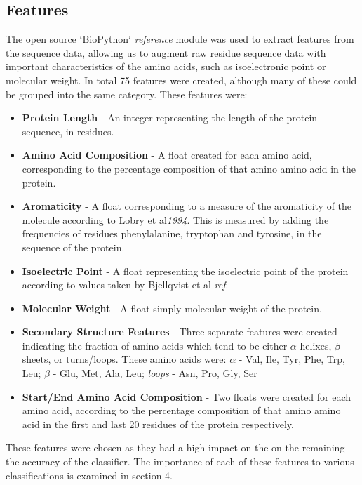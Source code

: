\documentclass{bioinfo}
\begin{document}
\subsection{Features}

The open source `BioPython` \textit{reference} module was used to extract features from the sequence data, allowing us to augment raw residue sequence data with important characteristics of the amino acids, such as isoelectronic point or molecular weight. In total 75 features were created, although many of these could be grouped into the same category. These features were:

\begin{itemize}


\item{ \textbf{Protein Length} } - An integer representing the length of the protein sequence, in residues.
\item{ \textbf{Amino Acid Composition} } - A float created for each amino acid, corresponding to the percentage composition of that amino amino acid in the protein.
\item{ \textbf{Aromaticity}} - A float corresponding to a measure of the aromaticity of the molecule according to Lobry et al\textit{1994}. This is measured by adding the frequencies of residues phenylalanine, tryptophan and tyrosine, in the sequence of the protein.
\item{ \textbf{Isoelectric Point}} - A float representing the isoelectric point of the protein according to values taken by Bjellqvist et al \textit{ref}.
\item{ \textbf{Molecular Weight}} - A float simply molecular weight of the protein. 
\item{ \textbf{Secondary Structure Features}} - Three separate features were created indicating the fraction of amino acids which tend to be either $\alpha$-helixes, $\beta$-sheets, or turns/loops. These amino acids were: $\alpha$ - Val, Ile, Tyr, Phe, Trp, Leu;   $\beta$ - Glu, Met, Ala, Leu; \textit{loops} -  Asn, Pro, Gly, Ser
\item{ \textbf{Start/End Amino Acid Composition} - Two floats were created for each amino acid, according to the percentage composition of that amino amino acid in the first and last 20 residues of the protein respectively.}

\end{itemize}

These features were chosen as they had a high impact on the on the remaining the accuracy of the classifier. The importance of each of these features to various classifications is examined in section 4.  
\end{document}

